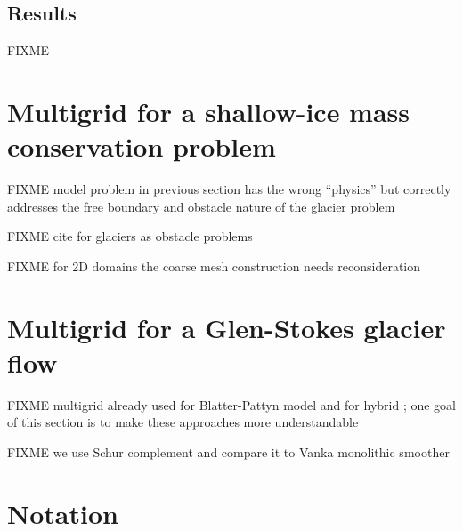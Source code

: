 \documentclass[letterpaper,final,12pt,reqno]{amsart}
\numberwithin{equation}{section}
\numberwithin{figure}{section}
\numberwithin{table}{section}
\begin{document}
\subsection*{Results} FIXME


\section{Multigrid for a shallow-ice mass conservation problem} \label{sec:sia}

FIXME model problem in previous section has the wrong ``physics'' but correctly addresses the free boundary and obstacle nature of the glacier problem

FIXME cite for glaciers as obstacle problems \cite{Bueler2016,Bueler2020,Calvoetal2002,JouvetBueler2012}

FIXME for 2D domains the coarse mesh construction needs reconsideration


\section{Multigrid for a Glen-Stokes glacier flow} \label{sec:stokes}

FIXME multigrid already used for Blatter-Pattyn model \cite{BrownSmithAhmadia2013} and for hybrid \cite{Jouvetetal2013}; one goal of this section is to make these approaches more understandable

FIXME we use Schur complement \cite{Bueler2021,Elmanetal2014} and compare it to Vanka monolithic smoother \cite{Farrelletal2019}

\small

\bigskip



\normalsize

\appendix
\section{Notation}
\end{document}
